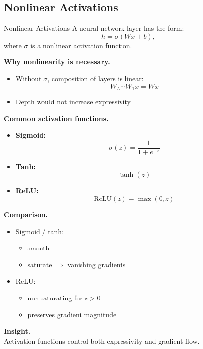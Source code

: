 \documentclass[aspectratio=169,11pt]{beamer}
\begin{document}
\subsection{Nonlinear Activations}
\begin{frame}[t,allowframebreaks]{Nonlinear Activations}
\small
A neural network layer has the form:
\[
h = \sigma(Wx + b),
\]
where $\sigma$ is a nonlinear activation function.

\textbf{Why nonlinearity is necessary.}\\ \begin{itemize}
    \item Without $\sigma$, composition of layers is linear:
    \[
    W_L \cdots W_1 x = W x
    \]
    \item Depth would not increase expressivity
\end{itemize}

\textbf{Common activation functions.}\\ \begin{itemize}
    \item \textbf{Sigmoid:}\\ \[
    \sigma(z) = \frac{1}{1 + e^{-z}}
    \]

    \item \textbf{Tanh:}\\ \[
    \tanh(z)
    \]

    \item \textbf{ReLU:}\\ \[
    \text{ReLU}(z) = \max(0, z)
    \]
\end{itemize}

\textbf{Comparison.}\\ \begin{itemize}
    \item Sigmoid / tanh:
    \begin{itemize}
        \item smooth
        \item saturate $\Rightarrow$ vanishing gradients
    \end{itemize}

    \item ReLU:
    \begin{itemize}
        \item non-saturating for $z > 0$
        \item preserves gradient magnitude
    \end{itemize}
\end{itemize}

\textbf{Insight.}\\ Activation functions control both expressivity and gradient flow.
\end{frame}
\end{document}
